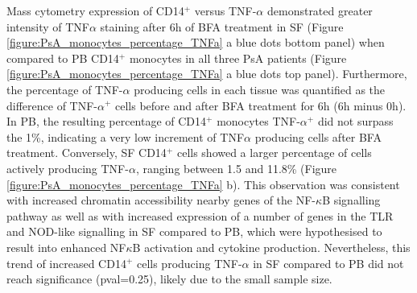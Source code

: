 Mass cytometry expression of CD14$^+$ versus TNF-$\alpha$ demonstrated greater intensity of TNF$\alpha$ staining after 6h of BFA treatment in SF (Figure \ref{figure:PsA_monocytes_percentage_TNFa} a blue dots bottom panel) when compared to PB CD14$^+$ monocytes in all three PsA patients (Figure \ref{figure:PsA_monocytes_percentage_TNFa} a blue dots top panel). Furthermore, the percentage of TNF-$\alpha$ producing cells in each tissue was quantified as the difference of TNF-$\alpha^+$ cells before and after BFA treatment for 6h (6h minus 0h). In PB, the resulting percentage of CD14$^+$ monocytes TNF-$\alpha^+$ did not surpass the 1\%, indicating a very low increment of TNF$\alpha$ producing cells after BFA treatment. Conversely, SF CD14$^+$ cells showed a larger percentage of cells actively producing TNF-$\alpha$, ranging between 1.5 and 11.8\% (Figure \ref{figure:PsA_monocytes_percentage_TNFa} b). This observation was consistent with increased chromatin accessibility nearby genes of the NF-$\kappa$B signalling pathway as well as with increased expression of a number of genes in the TLR and NOD-like signalling in SF compared to PB, which were hypothesised to result into enhanced NF$\kappa$B activation and cytokine production. Nevertheless, this trend of increased CD14$^+$ cells producing TNF-$\alpha$ in SF compared to PB did not reach significance (pval=0.25), likely due to the small sample size.
  


